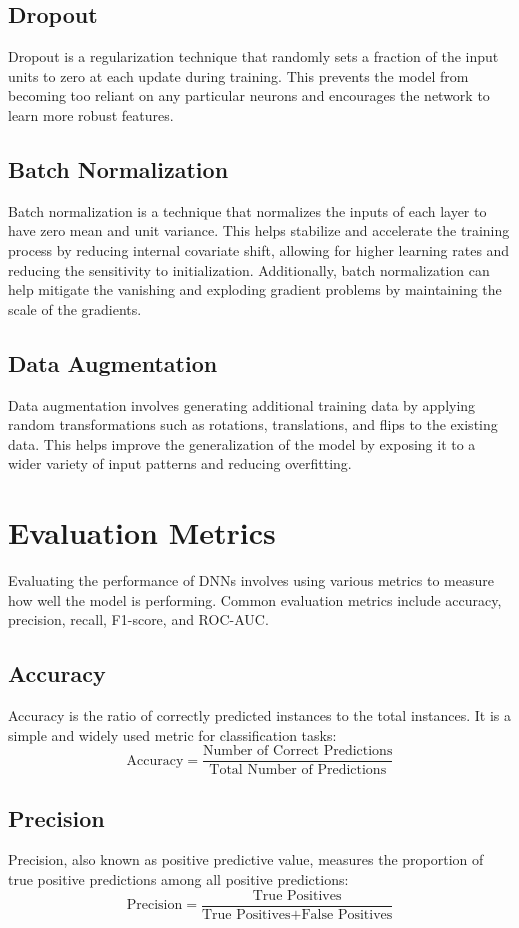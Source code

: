 \documentclass[12pt]{article}
\begin{document}
\subsection{Dropout}
Dropout is a regularization technique that randomly sets a fraction of the input units to zero at each update during training. This prevents the model from becoming too reliant on any particular neurons and encourages the network to learn more robust features.

\subsection{Batch Normalization}
Batch normalization is a technique that normalizes the inputs of each layer to have zero mean and unit variance. This helps stabilize and accelerate the training process by reducing internal covariate shift, allowing for higher learning rates and reducing the sensitivity to initialization. Additionally, batch normalization can help mitigate the vanishing and exploding gradient problems by maintaining the scale of the gradients.

\subsection{Data Augmentation}
Data augmentation involves generating additional training data by applying random transformations such as rotations, translations, and flips to the existing data. This helps improve the generalization of the model by exposing it to a wider variety of input patterns and reducing overfitting.

\section{Evaluation Metrics}
Evaluating the performance of DNNs involves using various metrics to measure how well the model is performing. Common evaluation metrics include accuracy, precision, recall, F1-score, and ROC-AUC.

\subsection{Accuracy}
Accuracy is the ratio of correctly predicted instances to the total instances. It is a simple and widely used metric for classification tasks:
\[
\text{Accuracy} = \frac{\text{Number of Correct Predictions}}{\text{Total Number of Predictions}}
\]

\subsection{Precision}
Precision, also known as positive predictive value, measures the proportion of true positive predictions among all positive predictions:
\[
\text{Precision} = \frac{\text{True Positives}}{\text{True Positives} + \text{False Positives}}
\]
\end{document}

